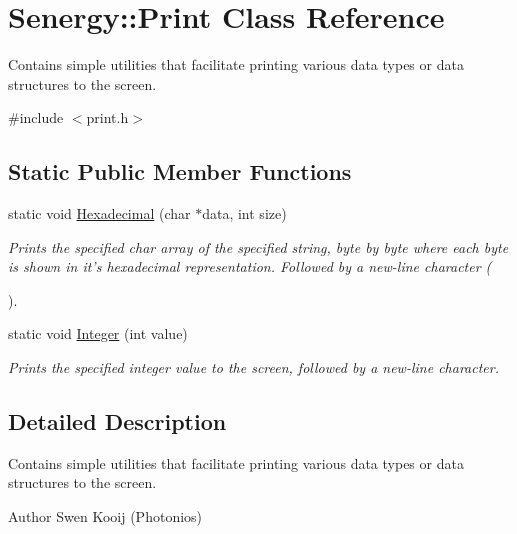 \hypertarget{class_senergy_1_1_print}{\section{Senergy\-:\-:Print Class Reference}
\label{class_senergy_1_1_print}
}


Contains simple utilities that facilitate printing various data types or data structures to the screen.  




{\ttfamily \#include $<$print.\-h$>$}

\subsection*{Static Public Member Functions}
\begin{DoxyCompactItemize}
\item 
static void \hyperlink{class_senergy_1_1_print_a6c6b70bd91e56896058004bf82201010}{Hexadecimal} (char $\ast$data, int size)
\begin{DoxyCompactList}\small\item\em Prints the specified char array of the specified string, byte by byte where each byte is shown in it's hexadecimal representation. Followed by a new-\/line character (\par
). \end{DoxyCompactList}\item 
static void \hyperlink{class_senergy_1_1_print_a7899dd50cdb0b0a6e7ed144d62ea227d}{Integer} (int value)
\begin{DoxyCompactList}\small\item\em Prints the specified integer value to the screen, followed by a new-\/line character. \end{DoxyCompactList}\end{DoxyCompactItemize}


\subsection{Detailed Description}
Contains simple utilities that facilitate printing various data types or data structures to the screen. 

\begin{DoxyAuthor}{Author}
Swen Kooij (Photonios) 
\end{DoxyAuthor}


